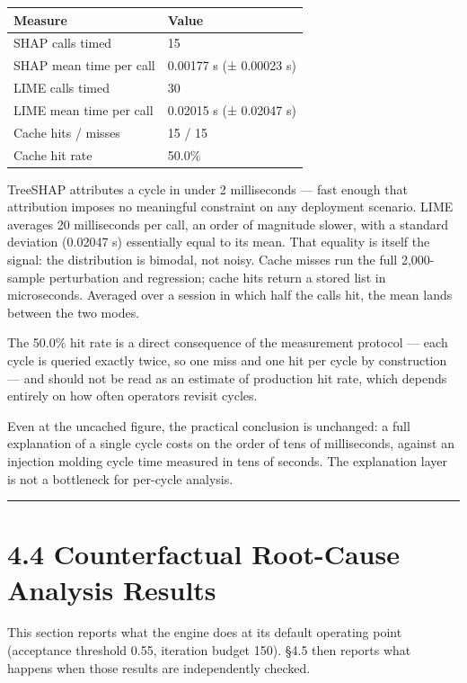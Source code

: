 \begin{longtable}[]{@{}ll@{}}
\toprule\noalign{}
Measure & Value \\
\midrule\noalign{}
\endhead
\bottomrule\noalign{}
\endlastfoot
SHAP calls timed & 15 \\
SHAP mean time per call & 0.00177 s (± 0.00023 s) \\
LIME calls timed & 30 \\
LIME mean time per call & 0.02015 s (± 0.02047 s) \\
Cache hits / misses & 15 / 15 \\
Cache hit rate & 50.0\% \\
\end{longtable}

TreeSHAP attributes a cycle in under 2 milliseconds --- fast enough that attribution imposes no meaningful constraint on any deployment scenario. LIME averages 20 milliseconds per call, an order of magnitude slower, with a standard deviation (0.02047 s) essentially equal to its mean. That equality is itself the signal: the distribution is bimodal, not noisy. Cache misses run the full 2,000-sample perturbation and regression; cache hits return a stored list in microseconds. Averaged over a session in which half the calls hit, the mean lands between the two modes.

The 50.0\% hit rate is a direct consequence of the measurement protocol --- each cycle is queried exactly twice, so one miss and one hit per cycle by construction --- and should not be read as an estimate of production hit rate, which depends entirely on how often operators revisit cycles.

Even at the uncached figure, the practical conclusion is unchanged: a full explanation of a single cycle costs on the order of tens of milliseconds, against an injection molding cycle time measured in tens of seconds. The explanation layer is not a bottleneck for per-cycle analysis.

\begin{center}\rule{0.5\linewidth}{0.5pt}\end{center}

\hypertarget{counterfactual-root-cause-analysis-results}{%
\section{4.4 Counterfactual Root-Cause Analysis Results}\label{counterfactual-root-cause-analysis-results}}

This section reports what the engine does at its default operating point (acceptance threshold 0.55, iteration budget 150). §4.5 then reports what happens when those results are independently checked.

